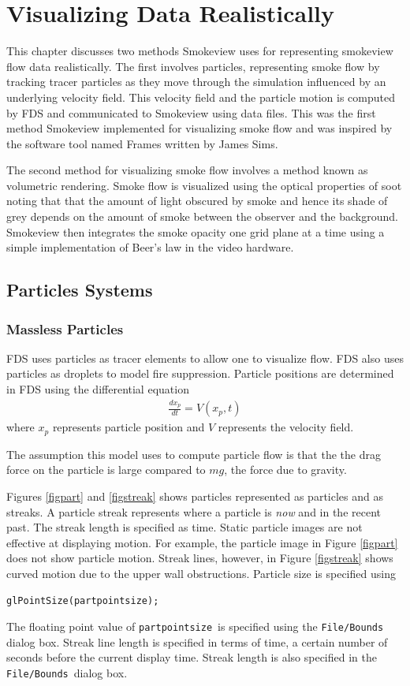 \documentclass[11pt,twoside]{book}
\begin{document}
\chapter{Visualizing Data Realistically}
This chapter discusses two methods Smokeview uses for representing smokeview flow data realistically.  The first involves particles, representing smoke flow by tracking tracer particles as they move through the simulation influenced by an underlying  velocity field.  This velocity field and the particle motion is computed by FDS and communicated to Smokeview using data files.  This was the first method Smokeview implemented for visualizing smoke flow and was inspired by the software tool named Frames written by James Sims.

The second method for visualizing smoke flow involves a method known as volumetric rendering.  Smoke flow is visualized using the optical properties of soot noting that that the amount of light obscured by smoke and hence its shade of grey depends on the amount of smoke between the observer and the background.  Smokeview then integrates the smoke opacity one grid plane at a time using a simple implementation of Beer's law in the video hardware.

\section{Particles Systems}
\subsection{Massless Particles}
FDS uses particles as tracer elements to allow one to visualize flow.  FDS
also uses particles as droplets to model fire suppression.  Particle positions are determined in FDS using the differential equation
\begin{eqnarray*}
\frac{dx_p}{dt}=V(x_p,t)
\end{eqnarray*}
where $x_p$ represents particle position and $V$ represents the velocity field.

The assumption this model uses to compute particle flow is that the the drag force on the particle is large compared to $mg$, the force due to gravity.

Figures \ref{figpart} and \ref{figstreak}
shows particles represented as particles and
as streaks.
A particle streak represents where a particle is {\em now} and in the recent past.  The streak length is specified as time.
Static particle images are not effective at displaying motion.  For example, the particle image in Figure \ref{figpart} does not show particle motion.  Streak lines, however, in Figure \ref{figstreak} shows curved motion due to the upper wall obstructions.
Particle size is
specified using
\begin{verbatim}
glPointSize(partpointsize);
\end{verbatim}
The floating point value of {\tt partpointsize}\ is specified using the {\tt File/Bounds}
dialog box.  Streak line length is specified in terms of time, a certain number of seconds before the current display time.  Streak length is also specified in the {\tt File/Bounds}\ dialog box.
\end{document}
